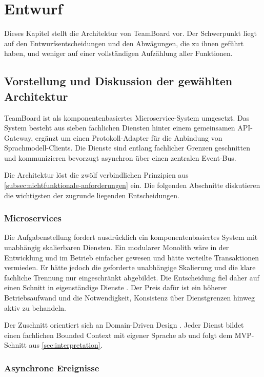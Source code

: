 \chapter{Entwurf}
\label{chap:entwurf}

Dieses Kapitel stellt die Architektur von TeamBoard vor. Der Schwerpunkt liegt auf den Entwurfsentscheidungen und den Abwägungen, die zu ihnen geführt haben, und weniger auf einer vollständigen Aufzählung aller Funktionen.

\section{Vorstellung und Diskussion der gewählten Architektur}
\label{sec:architektur-diskussion}

TeamBoard ist als komponentenbasiertes Microservice-System umgesetzt. Das System besteht aus sieben fachlichen Diensten hinter einem gemeinsamen API-Gateway, ergänzt um einen Protokoll-Adapter für die Anbindung von Sprachmodell-Clients. Die Dienste sind entlang fachlicher Grenzen geschnitten und kommunizieren bevorzugt asynchron über einen zentralen Event-Bus.

Die Architektur löst die zwölf verbindlichen Prinzipien aus \vref{subsec:nichtfunktionale-anforderungen} ein. Die folgenden Abschnitte diskutieren die wichtigsten der zugrunde liegenden Entscheidungen.

\subsection{Microservices}

Die Aufgabenstellung fordert ausdrücklich ein komponentenbasiertes System mit unabhängig skalierbaren Diensten. Ein modularer Monolith wäre in der Entwicklung und im Betrieb einfacher gewesen und hätte verteilte Transaktionen vermieden. Er hätte jedoch die geforderte unabhängige Skalierung und die klare fachliche Trennung nur eingeschränkt abgebildet. Die Entscheidung fiel daher auf einen Schnitt in eigenständige Dienste \cite{newman2021microservices}. Der Preis dafür ist ein höherer Betriebsaufwand und die Notwendigkeit, Konsistenz über Dienstgrenzen hinweg aktiv zu behandeln.

Der Zuschnitt orientiert sich an Domain-Driven Design \cite{evans2003ddd}. Jeder Dienst bildet einen fachlichen Bounded Context mit eigener Sprache ab und folgt dem MVP-Schnitt aus \vref{sec:interpretation}.

\subsection{Asynchrone Ereignisse}


